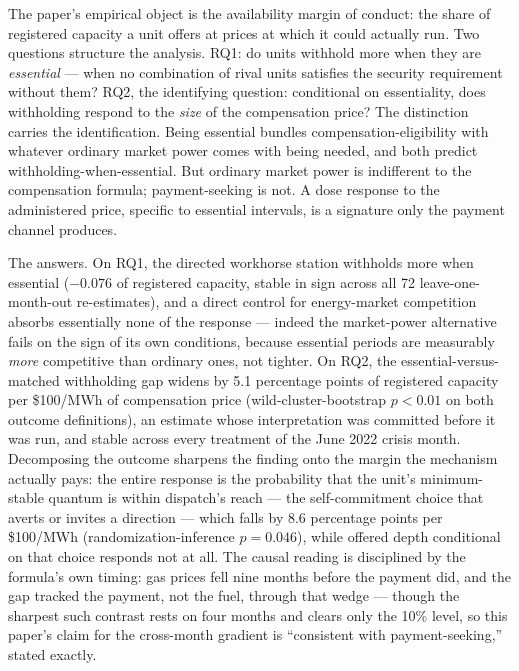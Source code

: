The paper's empirical object is the availability margin of conduct: the
share of registered capacity a unit offers at prices at which it could
actually run. Two questions structure the analysis. RQ1: do units withhold
more when they are \emph{essential} --- when no combination of rival units
satisfies the security requirement without them? RQ2, the identifying
question: conditional on essentiality, does withholding respond to the
\emph{size} of the compensation price? The distinction carries the
identification. Being essential bundles compensation-eligibility with
whatever ordinary market power comes with being needed, and both predict
withholding-when-essential. But ordinary market power is indifferent to the
compensation formula; payment-seeking is not. A dose response to the
administered price, specific to essential intervals, is a signature only the
payment channel produces.

The answers. On RQ1, the directed workhorse station withholds more when
essential ($-0.076$ of registered capacity, stable in sign across all 72
leave-one-month-out re-estimates), and a direct control for energy-market
competition absorbs essentially none of the response --- indeed the
market-power alternative fails on the sign of its own conditions, because
essential periods are measurably \emph{more} competitive than ordinary ones,
not tighter. On RQ2, the essential-versus-matched withholding gap widens by
5.1 percentage points of registered capacity per \$100/MWh of compensation
price (wild-cluster-bootstrap $p<0.01$ on both outcome definitions), an
estimate whose interpretation was committed before it was run, and stable
across every treatment of the June 2022 crisis month. Decomposing the
outcome sharpens the finding onto the margin the mechanism actually pays:
the entire response is the probability that the unit's minimum-stable
quantum is within dispatch's reach --- the self-commitment choice that
averts or invites a direction --- which falls by 8.6 percentage points per
\$100/MWh (randomization-inference $p=0.046$), while offered depth
conditional on that choice responds not at all. The causal reading is
disciplined by the formula's own timing: gas prices fell nine months before
the payment did, and the gap tracked the payment, not the fuel, through
that wedge --- though the sharpest such contrast rests on four months and
clears only the 10\% level, so this paper's claim for the cross-month
gradient is ``consistent with payment-seeking,'' stated exactly.

